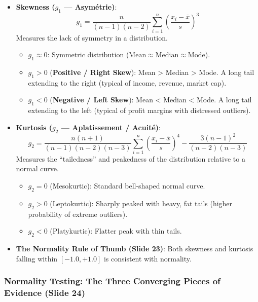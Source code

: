 \documentclass[
]{article}
\providecommand{\tightlist}{%
  \setlength{\itemsep}{0pt}\setlength{\parskip}{0pt}}
\begin{document}
\begin{itemize}
\tightlist
\item
  \textbf{Skewness (\(g_1\) --- Asymétrie)}:
  \[g_1 = \frac{n}{(n-1)(n-2)} \sum_{i=1}^n \left(\frac{x_i - \bar{x}}{s}\right)^3\]
  Measures the lack of symmetry in a distribution.

  \begin{itemize}
  \tightlist
  \item
    \(g_1 \approx 0\): Symmetric distribution
    (\(\text{Mean} \approx \text{Median} \approx \text{Mode}\)).
  \item
    \(g_1 > 0\) (\textbf{Positive / Right Skew}): Mean \textgreater{}
    Median \textgreater{} Mode. A long tail extending to the right
    (typical of income, revenue, market cap).
  \item
    \(g_1 < 0\) (\textbf{Negative / Left Skew}): Mean \textless{} Median
    \textless{} Mode. A long tail extending to the left (typical of
    profit margins with distressed outliers).
  \end{itemize}
\item
  \textbf{Kurtosis (\(g_2\) --- Aplatissement / Acuité)}:
  \[g_2 = \frac{n(n+1)}{(n-1)(n-2)(n-3)} \sum_{i=1}^n \left(\frac{x_i - \bar{x}}{s}\right)^4 - \frac{3(n-1)^2}{(n-2)(n-3)}\]
  Measures the ``tailedness'' and peakedness of the distribution
  relative to a normal curve.

  \begin{itemize}
  \tightlist
  \item
    \(g_2 = 0\) (Mesokurtic): Standard bell-shaped normal curve.
  \item
    \(g_2 > 0\) (Leptokurtic): Sharply peaked with heavy, fat tails
    (higher probability of extreme outliers).
  \item
    \(g_2 < 0\) (Platykurtic): Flatter peak with thin tails.
  \end{itemize}
\item
  \textbf{The Normality Rule of Thumb (Slide 23)}: Both skewness and
  kurtosis falling within \textbf{\([-1.0, +1.0]\)} is consistent with
  normality.
\end{itemize}

\subsubsection{Normality Testing: The Three Converging Pieces of
Evidence (Slide
24)}\label{normality-testing-the-three-converging-pieces-of-evidence-slide-24}
\end{document}
